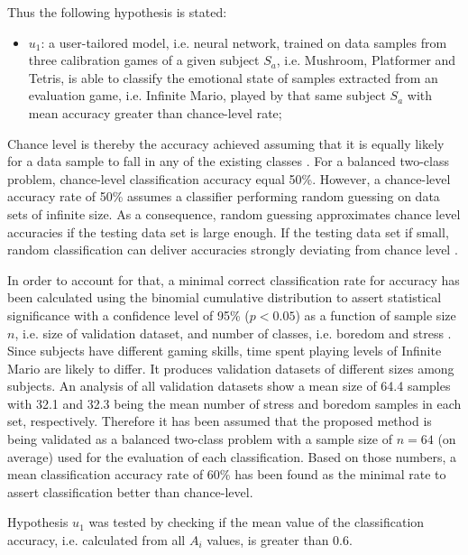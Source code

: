 Thus the following hypothesis is stated:

\begin{itemize}
  \item $u_1$: a user-tailored model, i.e. neural network, trained on data samples from three calibration games of a given subject $S_a$, i.e. Mushroom, Platformer and Tetris, is able to classify the emotional state of samples extracted from an evaluation game, i.e. Infinite Mario, played by that same subject $S_a$ with mean accuracy greater than chance-level rate;
\end{itemize}

Chance level is thereby the accuracy achieved assuming that it is equally likely for a data sample to fall in any of the existing classes \parencite{kassraian2016promises}. For a balanced two-class problem, chance-level classification accuracy equal 50\%. However, a chance-level accuracy rate of 50\% assumes a classifier performing random guessing on data sets of infinite size. As a consequence, random guessing approximates chance level accuracies if the testing data set is large enough. If the testing data set if small, random classification can deliver accuracies strongly deviating from chance level \parencite{combrisson2015exceeding}.

In order to account for that, a minimal correct classification rate for accuracy has been calculated using the binomial cumulative distribution to assert statistical significance with a confidence level of 95\% ($p < 0.05$) as a function of sample size $n$, i.e. size of validation dataset, and number of classes, i.e. boredom and stress \parencite{combrisson2015exceeding}. Since subjects have different gaming skills, time spent playing levels of Infinite Mario are likely to differ. It produces validation datasets of different sizes among subjects. An analysis of all validation datasets show a mean size of 64.4 samples with 32.1 and 32.3 being the mean number of stress and boredom samples in each set, respectively. Therefore it has been assumed that the proposed method is being validated as a balanced two-class problem with a sample size of $n=64$ (on average) used for the evaluation of each classification. Based on those numbers, a mean classification accuracy rate of 60\% has been found as the minimal rate to assert classification better than chance-level.

Hypothesis $u_1$ was tested by checking if the mean value of the classification accuracy, i.e. calculated from all $A_i$ values, is greater than 0.6.

